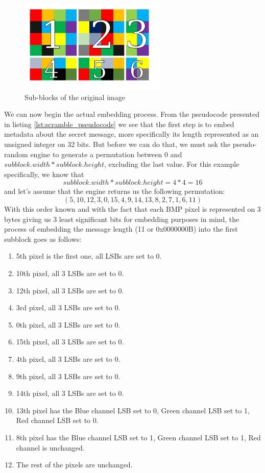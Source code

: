 \begin{multicols*}{2}
\begin{figure}[H]
    \centering
    \includegraphics[width=7cm,keepaspectratio]{pics/bmp_scrambling/image_broken_subblocks}
    \caption{Sub-blocks of the original image}
    \label{scramble_example_subblocks}
\end{figure}

We can now begin the actual embedding process. From the pseudocode presented in listing \ref{lst:scramble_pseudocode} we see that the first step is to embed metadata about the secret message, more specifically its length represented as an unsigned integer on 32 bits. But before we can do that, we must ask the pseudo-random engine to generate a permutation between 0 and $subblock.width * subblock.height$, excluding the last value. For this example specifically, we know that
\[ subblock.width * subblock.height = 4 * 4 = 16 \]
and let's assume that the engine returns us the following permutation: 
\[(5,10,12,3,0,15,4,9,14,13,8,2,7,1,6,11) \]
With this order known and with the fact that each BMP pixel is represented on 3 bytes giving us 3 least significant bits for embedding purposes in mind, the process of embedding the message length (11 or 0x0000000B) into the first subblock goes as follows:
\begin{enumerate}
  \item 5th pixel is the first one, all LSBs are set to 0.
  \item 10th pixel, all 3 LSBs are set to 0.
  \item 12th pixel, all 3 LSBs are set to 0.
  \item 3rd pixel, all 3 LSBs are set to 0.
  \item 0th pixel, all 3 LSBs are set to 0.
  \item 15th pixel, all 3 LSBs are set to 0.
  \item 4th pixel, all 3 LSBs are set to 0.
  \item 9th pixel, all 3 LSBs are set to 0.
  \item 14th pixel, all 3 LSBs are set to 0.
  \item 13th pixel has the Blue channel LSB set to 0, Green channel LSB set to 1, Red channel LSB set to 0.
  \item 8th pixel has the Blue channel LSB set to 1, Green channel LSB set to 1, Red channel is unchanged.
  \item The rest of the pixels are unchanged.
\end{enumerate}


\end{multicols*}
